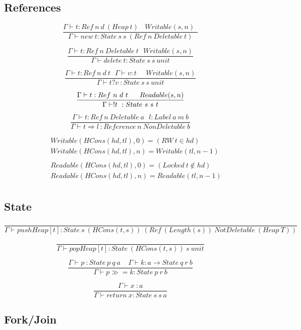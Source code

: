 \documentclass{article}
\begin{document}
\subsection{References}

$$\frac{\Gamma \vdash t:Ref\ n\ d\ \left(Heap\ t\right)\ \ \ \ Writable\left(s,n\right)\ \ }
		{\Gamma \vdash new\ t:State\ s\ s\ \left(Ref\ n\ Deletable\ t\right)}$$

$$\frac{\Gamma \vdash t:Ref\ n\ Deletable\ t\ \ \ Writable(s,n)}
		{\Gamma \vdash delete\ t:State\ s\ s\ unit}$$

$$\frac{\Gamma \vdash t:Ref\ n\ d\ t\ \ \ \Gamma \vdash v:t\ \ \ \ \ \ Writable(s,n)}
		{\Gamma \vdash t?v\ :State\ s\ s\ unit}$$

$$\frac{\Gamma \vdash t:Ref\ n\ d\ t\ \ \ {\rm \ \ }Readable(s,n)}
		{\Gamma \vdash !t\ :State\ s\ s\ t}$$

$$\frac{\Gamma \vdash t:Ref\ n\ Deletable\ a\ \ \ l:Label\ a\ m\ b}
		{\Gamma \vdash t\Rightarrow l\ :Reference\ n\ NonDeletable\ b}$$

\begin{eqnarray*}
	&&Writable\left(HCons\left(hd,tl\right),0\right) = \left(RW\ t\in hd\right) 		\\ 
	&&Writable\left(HCons\left(hd,tl\right),n\right) = Writable(tl,n-1) 				\\
								\\	
&&Readable(HCons(hd,tl),0) = (Locked\ t\notin hd) \\ 
&&Readable(HCons(hd,tl),n) = Readable(tl,n-1)		\\
\end{eqnarray*}


\subsection{State}

$$\frac{}
		{\Gamma \vdash pushHeap\left[t\right]:State\ s\ (HCons(t,s))\ (Ref\ (Length(s))\ NotDeletable\ (Heap\ T))}$$

$$\frac{}
		{\Gamma \vdash popHeap\left[t\right]:State\ (HCons(t,s))\ s\ unit}$$

$$\frac{\Gamma \vdash p\ :State\ p\ q\ a\ \ \ \ \ \Gamma \vdash k:a\to State\ q\ r\ b}
		{\Gamma \vdash p\gg =k:State\ p\ r\ b}$$

$$\frac{\Gamma \vdash x\ :a}
		{\Gamma \vdash return\ x:State\ s\ s\ a}$$


\subsection{Fork/Join}
\end{document}
